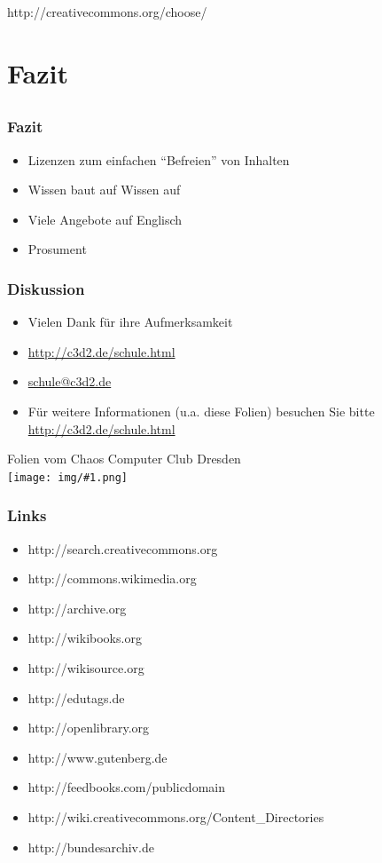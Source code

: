 \documentclass[table]{beamer}
\newcommand{\cc}[1]{\texttt{[image: img/\#1.png]}}
\begin{document}
\begin{frame}
    \begin{center}\Large
    http://creativecommons.org/choose/
    \end {center}
\end{frame}

\section{Fazit}
\subsection{}

\begin{frame}
    \frametitle{Fazit}
    \begin{itemize}
      \item<2-> Lizenzen zum einfachen ``Befreien'' von Inhalten
      \item<3-> Wissen baut auf Wissen auf
      \item<4-> Viele Angebote auf Englisch
      \item<5-> Prosument
    \end{itemize}
\end{frame}

\begin{frame}
    \frametitle{Diskussion}
    \begin{itemize}
        \item Vielen Dank für ihre Aufmerksamkeit
        \item \url{http://c3d2.de/schule.html}
        \item \url{schule@c3d2.de}
        \item Für weitere Informationen (u.a. diese Folien) besuchen Sie bitte \url{http://c3d2.de/schule.html}
    \end{itemize}
    \begin{center}
   Folien vom Chaos Computer Club Dresden\\
   {\cc{by-sa}}
   \end{center}
\end{frame}

\begin{frame}
  \frametitle{Links}
  \begin{itemize}
    \item http://search.creativecommons.org
    \item http://commons.wikimedia.org
    \item http://archive.org
    \item http://wikibooks.org
    \item http://wikisource.org
    \item http://edutags.de
    \item http://openlibrary.org
    \item http://www.gutenberg.de
    \item http://feedbooks.com/publicdomain
    \item http://wiki.creativecommons.org/Content\_Directories
    \item http://bundesarchiv.de
  \end{itemize}
\end{frame}
\end{document}
